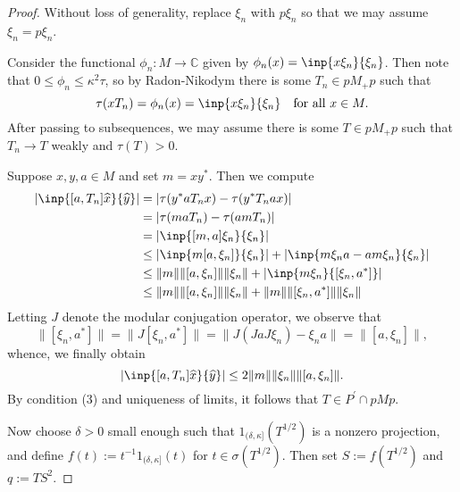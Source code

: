 \documentclass[a4paper,11pt]{article}
\numberwithin{equation}{section}
\theoremstyle{definition}
\theoremstyle{remark}
\numberwithin{equation}{section}
\newcommand{\C}{\mathbb{C}}
\providecommand{\norm}[1]{\lVert#1\rVert}
\numberwithin{equation}{section}
\begin{document}
\begin{proof}
    Without loss of generality, replace $ \xi_{n} $ with $ p \xi_{n} $ so that we may assume $ \xi_{n}=p \xi_{n} $.

    Consider the functional $ \phi_{n}:M\to \C $ given by $ \phi_{n}(x)=\inp{x \xi_{n}}{\xi_{n}} $. Then note that $ 0\leq \phi_{n}\leq \kappa^{2} \tau $, so by Radon-Nikodym there is some $ T_{n}\in pM_{+}p $ such that 
    \[
        \tau(xT_{n}) = \phi_{n}(x) = \inp{x \xi_{n}}{\xi_{n}} \quad \text{for all }x\in M.
    \]
    After passing to subsequences, we may assume there is some $ T\in pM_{+}p $ such that $ T_{n}\to T $ weakly and $ \tau(T) > 0 $. 

    Suppose $ x,y,a\in M $ and set $ m=xy^{*} $. Then we compute 
    \begin{align*}
        |\inp{[a,T_{n}]\widehat{x}}{\widehat{y}}| &= |\tau(y^{*}aT_{n}x)-\tau(y^{*}T_{n}ax)| \\
        &= |\tau(maT_{n}) - \tau(amT_{n})|\\
        &= |\inp{[m,a] \xi_{n}}{\xi_{n}}| \\
        &\leq |\inp{m[a,\xi_{n}]}{\xi_{n}}| + |\inp{m \xi_{n}a - am \xi_{n}}{\xi_{n}}|\\
        &\leq \norm{m}\norm{[a,\xi_{n}]}\norm{\xi_{n}} +|\inp{m \xi_{n}}{[\xi_{n},a^{*}]}|\\
        &\leq  \norm{m}\norm{[a,\xi_{n}]}\norm{\xi_{n}} + \norm{m}\norm{[\xi_{n},a^{*}]}\norm{\xi_{n}}
    \end{align*} 
    Letting $ J $ denote the modular conjugation operator, we observe that 
    \[
        \norm{[\xi_{n},a^{*}]} = \norm{J[\xi_{n},a^{*}]} = \norm{J(JaJ \xi_{n})-\xi_{n}a} =\norm{[a,\xi_{n}]},
    \]
    whence, we finally obtain 
    \begin{equation}
        |\inp{[a,T_{n}] \widehat{x}}{\widehat{y}}| \leq 2\norm{m}\norm{\xi_{n}}\norm{[a,\xi_{n}]}.
    \end{equation}
    By condition (3) and uniqueness of limits, it follows that $ T\in P^{\prime}\cap pMp $.

    Now choose $ \delta>0 $ small enough such that $ 1_{(\delta, \kappa] }(T^{1/2}) $ is a nonzero projection, and define $ f(t):=t^{-1}1_{(\delta, \kappa]}(t) $ for $ t\in \sigma(T^{1/2}) $. Then set $ S:= f(T^{1/2}) $ and $ q:=TS^{2} $. 


\end{proof}
\end{document}

